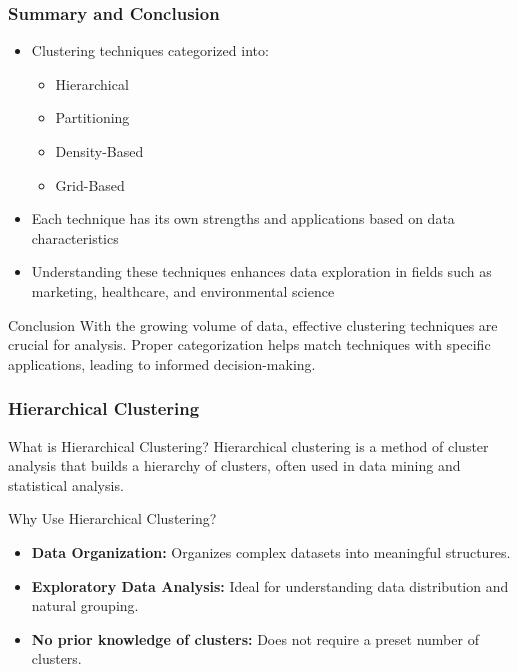 \documentclass[aspectratio=169]{beamer}
\begin{document}
\begin{frame}[fragile]
    \frametitle{Summary and Conclusion}
    \begin{itemize}
        \item Clustering techniques categorized into:
            \begin{itemize}
                \item Hierarchical
                \item Partitioning
                \item Density-Based
                \item Grid-Based
            \end{itemize}
        \item Each technique has its own strengths and applications based on data characteristics
        \item Understanding these techniques enhances data exploration in fields such as marketing, healthcare, and environmental science
    \end{itemize}
    
    \begin{block}{Conclusion}
        With the growing volume of data, effective clustering techniques are crucial for analysis. Proper categorization helps match techniques with specific applications, leading to informed decision-making.
    \end{block}
\end{frame}

\begin{frame}[fragile]
    \frametitle{Hierarchical Clustering}
    \begin{block}{What is Hierarchical Clustering?}
        Hierarchical clustering is a method of cluster analysis that builds a hierarchy of clusters, often used in data mining and statistical analysis.
    \end{block}

    \begin{block}{Why Use Hierarchical Clustering?}
        \begin{itemize}
            \item \textbf{Data Organization:} Organizes complex datasets into meaningful structures.
            \item \textbf{Exploratory Data Analysis:} Ideal for understanding data distribution and natural grouping.
            \item \textbf{No prior knowledge of clusters:} Does not require a preset number of clusters.
        \end{itemize}
    \end{block}
\end{frame}
\end{document}
